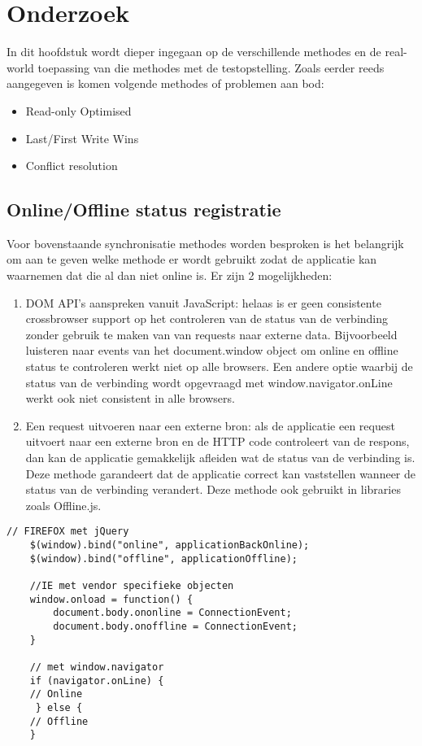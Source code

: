 
\chapter{Onderzoek}
\label{ch:onderzoek}

In dit hoofdstuk wordt dieper ingegaan op de verschillende methodes  en de real-world toepassing van die methodes met de testopstelling. Zoals eerder reeds aangegeven is komen volgende methodes of problemen aan bod:
\begin{itemize}
\item Read-only Optimised
\item Last/First Write Wins
\item Conflict resolution
\end{itemize}

\section{Online/Offline status registratie}
Voor bovenstaande synchronisatie methodes worden besproken is het belangrijk om aan te geven welke methode er wordt gebruikt zodat de applicatie kan waarnemen dat die al dan niet online is. Er zijn 2 mogelijkheden:
\begin{enumerate}
\item DOM API's aanspreken vanuit JavaScript: helaas is er geen consistente crossbrowser support op het controleren van de status van de verbinding zonder gebruik te maken van van requests naar externe data. Bijvoorbeeld luisteren naar events van het document.window object om online en offline status te controleren werkt niet op alle browsers. Een andere optie waarbij de status van de verbinding wordt opgevraagd met window.navigator.onLine werkt ook niet consistent in alle browsers.
\item Een request uitvoeren naar een externe bron: als de applicatie een request uitvoert naar een externe bron en de HTTP code controleert van de respons, dan kan de applicatie gemakkelijk afleiden wat de status van de verbinding is. Deze methode garandeert dat de applicatie correct kan vaststellen wanneer de status van de verbinding verandert. Deze methode ook gebruikt in libraries zoals Offline.js.
\end{enumerate}

\begin{lstlisting}[caption=DOM API's voor controleren offline en online status]
    // FIREFOX met jQuery
    $(window).bind("online", applicationBackOnline); 
    $(window).bind("offline", applicationOffline);

    //IE met vendor specifieke objecten
    window.onload = function() {
        document.body.ononline = ConnectionEvent;
        document.body.onoffline = ConnectionEvent;
    }
    
    // met window.navigator
    if (navigator.onLine) {
  	// Online
     } else {
  	// Offline
	}
    
\end{lstlisting}

